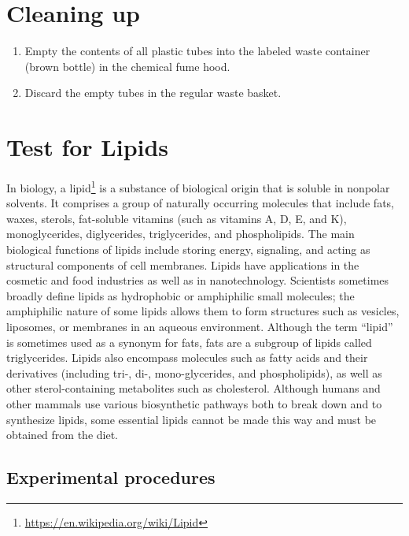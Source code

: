 \documentclass[]{book}
\providecommand{\tightlist}{%
  \setlength{\itemsep}{0pt}\setlength{\parskip}{0pt}}
\let\rmarkdownfootnote\footnote%
\def\footnote{\protect\rmarkdownfootnote}
\renewcommand{\href}[2]{#2\footnote{\url{#1}}}
\theoremstyle{definition}
\theoremstyle{definition}
\theoremstyle{definition}
\theoremstyle{remark}
\begin{document}
\section{Cleaning up}\label{cleaning-up}

\begin{enumerate}
\def\labelenumi{\arabic{enumi}.}
\tightlist
\item
  Empty the contents of all plastic tubes into the labeled waste
  container (brown bottle) in the chemical fume hood.
\item
  Discard the empty tubes in the regular waste basket.
\end{enumerate}

\section{Test for Lipids}\label{test-for-lipids}

In biology, a \href{https://en.wikipedia.org/wiki/Lipid}{lipid} is a
substance of biological origin that is soluble in nonpolar solvents. It
comprises a group of naturally occurring molecules that include fats,
waxes, sterols, fat-soluble vitamins (such as vitamins A, D, E, and K),
monoglycerides, diglycerides, triglycerides, and phospholipids. The main
biological functions of lipids include storing energy, signaling, and
acting as structural components of cell membranes. Lipids have
applications in the cosmetic and food industries as well as in
nanotechnology. Scientists sometimes broadly define lipids as
hydrophobic or amphiphilic small molecules; the amphiphilic nature of
some lipids allows them to form structures such as vesicles, liposomes,
or membranes in an aqueous environment. Although the term ``lipid'' is
sometimes used as a synonym for fats, fats are a subgroup of lipids
called triglycerides. Lipids also encompass molecules such as fatty
acids and their derivatives (including tri-, di-, mono-glycerides, and
phospholipids), as well as other sterol-containing metabolites such as
cholesterol. Although humans and other mammals use various biosynthetic
pathways both to break down and to synthesize lipids, some essential
lipids cannot be made this way and must be obtained from the diet.

\subsection{Experimental procedures}\label{experimental-procedures-4}
\end{document}
